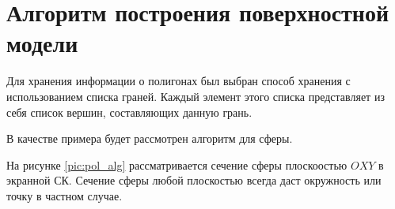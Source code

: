     \section{Алгоритм построения поверхностной модели}
    \par Для хранения информации о полигонах был выбран способ хранения с использованием списка граней. Каждый элемент этого списка представляет из себя список вершин, составляющих данную грань.
    \par В качестве примера будет рассмотрен алгоритм для сферы.
    \par На рисунке \ref{pic:pol_alg} рассматривается сечение сферы плоскоостью \begin{math}OXY\end{math} в экранной СК. Сечение сферы любой плоскостью всегда даст окружность или точку в частном случае.

